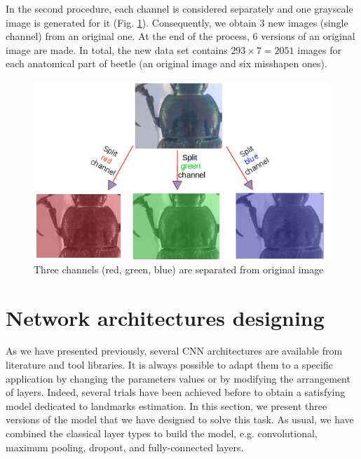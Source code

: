 \documentclass[review]{elsarticle}
\begin{document}
In the second procedure, each channel is considered separately and one
grayscale image is generated for it (Fig. \ref{figaug2}). Consequently, we
obtain 3 new images (single channel) from an original one. At the end
of the process, $6$ versions of an original image are made. In total,
the new data set contains $293 \times 7 = 2051$ images for each
anatomical part of beetle (an original image and six misshapen ones).

\begin{figure}[h]
	\centering
	\includegraphics[scale=0.4]{images/sp_channels}
	\caption{Three channels (red, green, blue) are separated from original image}
	\label{figaug2}
\end{figure}

\section{Network architectures designing}
\label{Sneuralnetwork}
As we have presented previously, several CNN architectures are
available from literature and tool libraries. It is always possible
to adapt them to a specific application by changing the parameters
values or by modifying the arrangement of layers. Indeed, several
trials have been achieved before to obtain a satisfying model
dedicated to landmarks estimation. In this section, we present three
versions of the model that we have designed to solve this task. As
usual, we have combined the classical layer types to build the model,
e.g. convolutional, maximum pooling, dropout, and fully-connected
layers.
\end{document}
